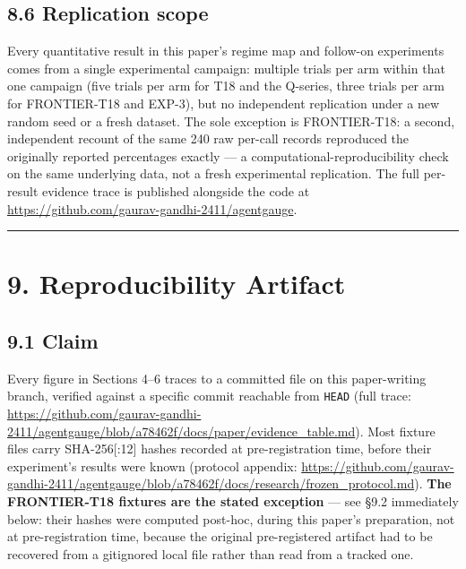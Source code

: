 \hypertarget{replication-scope}{%
\subsection{8.6 Replication scope}\label{replication-scope}}

Every quantitative result in this paper's regime map and follow-on experiments comes from a
single experimental campaign: multiple trials per arm within that one campaign (five trials per
arm for T18 and the Q-series, three trials per arm for FRONTIER-T18 and EXP-3), but no
independent replication under a new random seed or a fresh dataset. The sole exception is
FRONTIER-T18: a second, independent recount of the same 240 raw per-call records reproduced the
originally reported percentages exactly --- a computational-reproducibility check on the same
underlying data, not a fresh experimental replication. The full per-result evidence trace is
published alongside the code at \url{https://github.com/gaurav-gandhi-2411/agentgauge}.

\begin{center}\rule{0.5\linewidth}{0.5pt}\end{center}

\hypertarget{reproducibility-artifact}{%
\section{9. Reproducibility Artifact}\label{reproducibility-artifact}}

\hypertarget{claim}{%
\subsection{9.1 Claim}\label{claim}}

Every figure in Sections 4--6 traces to a committed file on this
paper-writing branch, verified against a specific commit reachable from
\texttt{HEAD} (full trace:
\url{https://github.com/gaurav-gandhi-2411/agentgauge/blob/a78462f/docs/paper/evidence_table.md}).
Most
fixture files carry SHA-256{[}:12{]} hashes recorded at pre-registration
time, before their experiment's results were known (protocol appendix:
\url{https://github.com/gaurav-gandhi-2411/agentgauge/blob/a78462f/docs/research/frozen_protocol.md}).
\textbf{The FRONTIER-T18
fixtures are the stated exception} --- see §9.2 immediately below: their
hashes were computed post-hoc, during this paper's preparation, not at
pre-registration time, because the original pre-registered artifact had
to be recovered from a gitignored local file rather than read from a
tracked one.

